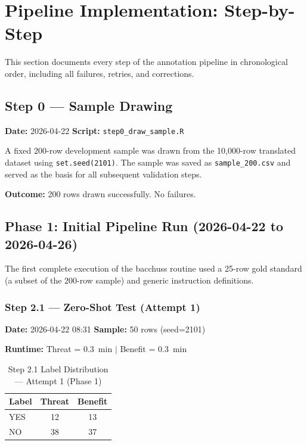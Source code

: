 ﻿%
\section{Pipeline Implementation: Step-by-Step}
\label{sec:pipeline}

This section documents every step of the annotation pipeline in chronological order, including all failures, retries, and corrections.

\subsection{Step 0 --- Sample Drawing}
\label{sec:step0}

\textbf{Date:} 2026-04-22 \quad \textbf{Script:} \texttt{step0\_draw\_sample.R}

A fixed 200-row development sample was drawn from the 10,000-row translated dataset using \texttt{set.seed(2101)}. The sample was saved as \texttt{sample\_200.csv} and served as the basis for all subsequent validation steps.

\textbf{Outcome:} 200 rows drawn successfully. No failures.

\subsection{Phase 1: Initial Pipeline Run (2026-04-22 to 2026-04-26)}
\label{sec:phase1}

The first complete execution of the bacchuss routine used a 25-row gold standard (a subset of the 200-row sample) and generic instruction definitions.

\subsubsection{Step 2.1 --- Zero-Shot Test (Attempt 1)}
\label{sec:step21_attempt1}

\textbf{Date:} 2026-04-22 08:31 \quad \textbf{Sample:} 50 rows (seed=2101)

\textbf{Runtime:} Threat = 0.3~min $|$ Benefit = 0.3~min

\begin{table}[H]
\centering
\caption{Step 2.1 Label Distribution --- Attempt 1 (Phase 1)}
\begin{tabular}{@{}lcc@{}}
\toprule
\textbf{Label} & \textbf{Threat} & \textbf{Benefit} \\
\midrule
YES & 12 & 13 \\
NO  & 38 & 37 \\
\bottomrule
\end{tabular}
\end{table}

